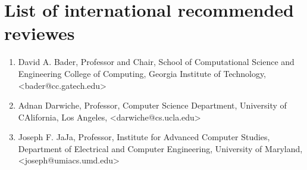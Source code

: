 \section{List of international recommended reviewes}

\begin{enumerate}
\item{David A. Bader, Professor and Chair, School of Computational Science and Engineering College of Computing, Georgia Institute of Technology, <bader@cc.gatech.edu>}
\item{Adnan Darwiche, Professor,  Computer Science Department, University of CAlifornia, Los Angeles, <darwiche@cs.ucla.edu>}
\item{Joseph F. JaJa, Professor, Institute for Advanced Computer Studies, Department of Electrical and Computer Engineering, University of Maryland, <joseph@umiacs.umd.edu>}
\end{enumerate}
